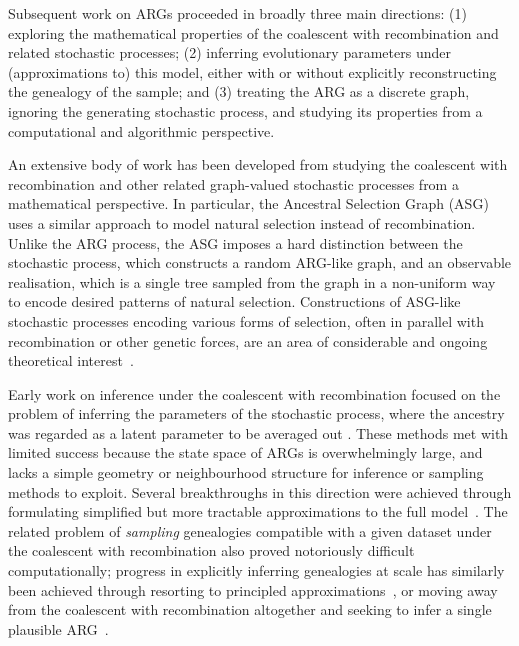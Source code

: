 \documentclass{article}
\begin{document}
Subsequent work on ARGs proceeded in broadly three main directions:
(1) exploring the mathematical properties of the coalescent with recombination and
related stochastic processes;
(2) inferring evolutionary parameters under
(approximations to) this model, either with or without explicitly reconstructing the
genealogy of the sample;
and (3) treating the ARG as a discrete graph, ignoring the
generating stochastic process, and studying its properties from a computational and
algorithmic perspective.

An extensive body of work has been developed from
studying the coalescent with recombination
and other related
graph-valued stochastic processes from a mathematical perspective.
In particular, the Ancestral Selection Graph
(ASG)~\citep{krone1997ancestral,neuhauser1997genealogy}
uses a similar approach to model natural selection instead of recombination.
Unlike the ARG process, the ASG imposes a hard distinction between the stochastic process,
which constructs a random ARG-like graph, and an observable realisation,
which is a single tree sampled from the graph in a non-uniform way to encode
desired patterns of natural selection.
Constructions of ASG-like stochastic processes encoding various
forms of selection, often in parallel with recombination or other genetic forces,
are an area of considerable and ongoing theoretical interest~\citep[e.g.][]{
neuhauser1999ancestral,
donnelly1999genealogical,
fearnhead2001perfect,
fearnhead2003ancestral,
etheridge2009coalescent,
baumdicker2014AGTG,
gonzalezcasanova2018duality,
koskela2019robust}.

Early work on inference under the coalescent with recombination
focused on the problem of
inferring the parameters of the
stochastic process, where the ancestry was regarded as a
latent parameter to be averaged out
\citep[e.g.][]{griffiths1996ancestral,kuhner2000maximum, nielsen2000estimation,
fearnhead2001estimating}.
These methods met with limited success
because the state space of ARGs is overwhelmingly large, and
lacks a simple geometry or neighbourhood structure for inference or
sampling methods to  exploit.
Several breakthroughs in this direction were achieved through
formulating simplified but more tractable approximations to the full
model~\citep{mcvean2005approximating,marjoram2006fast,li2011inference,
paul2011accurate,schiffels2014inferring}.
The related problem of \emph{sampling} genealogies compatible with a given
dataset under the coalescent with recombination also proved notoriously difficult
computationally; progress in explicitly inferring genealogies at scale
has similarly been achieved through resorting to principled
approximations~\citep{rasmussen2014genome,mahmoudi2022bayesian,deng2024robust},
or moving away from the coalescent with recombination altogether and seeking
to infer a single plausible ARG~\citep[e.g.][]{
minichiello2006mapping,kelleher2019inferring,speidel2019method}.
\end{document}
